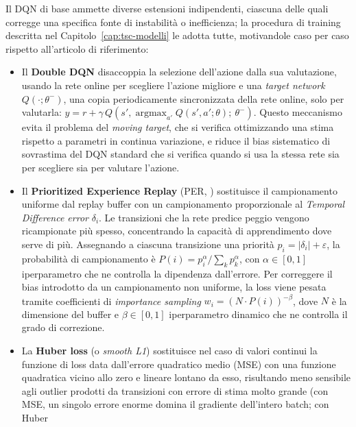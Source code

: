 Il DQN di base ammette diverse estensioni indipendenti, ciascuna delle
quali corregge una specifica fonte di instabilità o inefficienza; la
procedura di training descritta nel Capitolo~\ref{cap:tsc-modelli} le
adotta tutte, motivandole caso per caso rispetto all'articolo di
riferimento:
\begin{itemize}
  \item Il \textbf{Double DQN} \citep{vanhasselt2016double} disaccoppia la
        selezione dell'azione dalla sua valutazione, usando la rete online per
        scegliere l'azione migliore e una \emph{target network}
        $Q(\cdot;\theta^-)$, una copia periodicamente sincronizzata della rete
        online, solo per valutarla:
        $y = r + \gamma\, Q\!\left(s', \operatorname*{argmax}_{a'}
          Q(s',a';\theta);\ \theta^-\right)$. Questo meccanismo evita il problema
        del \emph{moving target}, che si verifica ottimizzando una stima
        rispetto a parametri in continua variazione, e riduce il bias
        sistematico di sovrastima del DQN standard che si verifica quando si usa la stessa rete sia
        per scegliere sia per valutare l'azione.
  \item Il \textbf{Prioritized Experience Replay} (PER,
        \citealp{schaul2016per}) sostituisce il campionamento uniforme dal
        replay buffer con un campionamento proporzionale al \emph{Temporal Difference error} $\delta_i$.
        Le transizioni che la rete predice peggio vengono ricampionate più
        spesso, concentrando la capacità di apprendimento dove serve di più.
        Assegnando a ciascuna transizione una priorità $p_i = |\delta_i| +
          \varepsilon$, la probabilità di campionamento è $P(i) = p_i^\alpha /
          \sum_k p_k^\alpha$, con $\alpha \in [0,1]$ iperparametro che ne
        controlla la dipendenza dall'errore. Per correggere il bias introdotto
        da un campionamento non uniforme, la loss viene pesata tramite
        coefficienti di \emph{importance sampling} $w_i = \left(N \cdot
          P(i)\right)^{-\beta}$, dove $N$ è la dimensione del buffer e $\beta \in
          [0,1]$ iperparametro dinamico che ne controlla il grado di correzione.
  \item La \textbf{Huber loss} (o \emph{smooth L1}) sostituisce nel caso di valori continui la funzione di loss data dall'errore
        quadratico medio (MSE) con una funzione quadratica vicino allo zero e
        lineare lontano da esso, risultando meno sensibile agli outlier
        prodotti da transizioni con errore di stima molto grande (con MSE, un
        singolo errore enorme domina il gradiente dell'intero batch; con Huber

\end{itemize}
